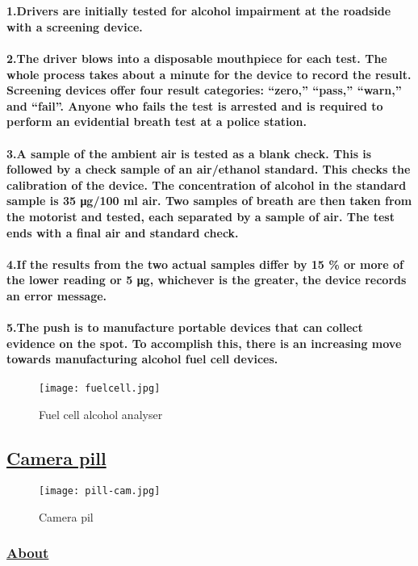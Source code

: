 \documentclass[12pt]{article}
\begin{document}
        \paragraph{ 
        	\\\textbf{1.}Drivers are initially tested for alcohol impairment at the roadside with a screening device. 
        	\\\\\textbf{2.}The driver blows into a disposable mouthpiece for each test. The whole process takes about a minute for the device to record the result. Screening devices offer four result categories: “zero,” “pass,” “warn,” and “fail”. Anyone who fails the test is arrested and is required to perform an evidential breath test at a police station.
            \\\\\textbf{3.}A sample of the ambient air is tested as a blank check. This is followed by a check sample of an air/ethanol standard. This checks the calibration of the device. The concentration of alcohol in the standard sample is 35 μg/100 ml air. Two samples of breath are then taken from the motorist and tested, each separated by a sample of air. The test ends with a final air and standard check.
            \\\\\textbf{4.}If the results from the two actual samples differ by 15 \% or more of the lower reading or 5 μg, whichever is the greater, the device records an error message. 
        	\\\\\textbf{5.}The push is to manufacture portable devices that can collect evidence on the spot. To accomplish this, there is an increasing move towards manufacturing alcohol fuel cell devices.}
        \begin{figure}[h]
        	\centering
        	\texttt{[image: fuelcell.jpg]}
        	\caption{Fuel cell alcohol analyser}
        \end{figure}
        \clearpage    
        \subsection{\textbf{\underline{Camera pill}}}
         \begin{figure}[h]
        	\texttt{[image: pill-cam.jpg]}
        	\caption{Camera pil}
        \end{figure}
        \subsubsection{\underline{About}}
\end{document}
